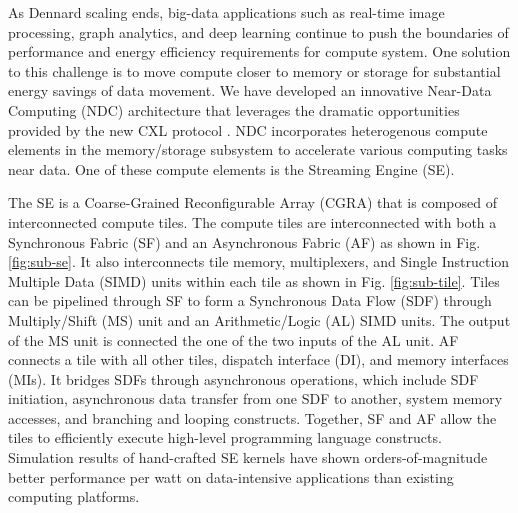 As Dennard scaling ends, big-data applications such as real-time image processing, graph analytics, and deep learning continue to push the boundaries of performance and energy efficiency requirements for compute system. 
One solution to this challenge is to move compute closer to memory or storage for substantial energy savings of data movement. 
We have developed an innovative Near-Data Computing (NDC) architecture that leverages the dramatic opportunities provided by the new CXL protocol \cite{sharma2020compute}. 
NDC incorporates heterogenous compute elements in the memory/storage subsystem to accelerate various computing tasks near data. 
One of these compute elements is the Streaming Engine (SE).

The SE is a Coarse-Grained Reconfigurable Array (CGRA) that is composed of interconnected compute tiles.  
The compute tiles are interconnected with both a Synchronous Fabric (SF) and an Asynchronous Fabric (AF) as shown in Fig. \ref{fig:sub-se}.
It also interconnects tile memory, multiplexers, and Single Instruction Multiple Data (SIMD) units within each tile as shown in Fig. \ref{fig:sub-tile}. 
Tiles can be pipelined through SF to form a Synchronous Data Flow (SDF) through Multiply/Shift (MS) unit and an Arithmetic/Logic (AL) SIMD units. 
The output of the MS unit is connected the one of the two inputs of the AL unit.
AF connects a tile with all other tiles, dispatch interface (DI), and memory interfaces (MIs).
It bridges SDFs through asynchronous operations, which include SDF initiation, asynchronous data transfer from one SDF to another, system memory accesses, and branching and looping constructs. 
Together, SF and AF allow the tiles to efficiently execute high-level programming language constructs.
Simulation results of hand-crafted SE kernels have shown orders-of-magnitude better performance per watt on data-intensive applications than existing computing platforms.

